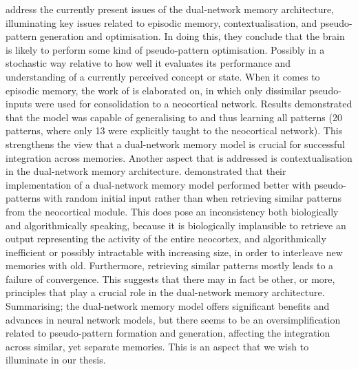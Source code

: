 \cite{French2001} address the currently present issues of the dual-network memory architecture, illuminating key issues related to episodic memory, contextualisation, and pseudo-pattern generation and optimisation. In doing this, they conclude that the brain is likely to perform some kind of pseudo-pattern optimisation. Possibly in a stochastic way relative to how well it evaluates its performance and understanding of a currently perceived concept or state. When it comes to episodic memory, the work of \cite{Ans2000} is elaborated on, in which only dissimilar pseudo-inputs were used for consolidation to a neocortical network. Results demonstrated that the model was capable of generalising to and thus learning all patterns (20 patterns, where only 13 were explicitly taught to the neocortical network). This strengthens the view that a dual-network memory model is crucial for successful integration across memories. Another aspect that is addressed is contextualisation in the dual-network memory architecture. \cite{Ans2000} demonstrated that their implementation of a dual-network memory model performed better with pseudo-patterns with random initial input rather than when retrieving similar patterns from the neocortical module. This does pose an inconsistency both biologically and algorithmically speaking, because it is biologically implausible to retrieve an output representing the activity of the entire neocortex, and algorithmically inefficient or possibly intractable with increasing size, in order to interleave new memories with old. Furthermore, retrieving similar patterns mostly leads to a failure of convergence. This suggests that there may in fact be other, or more, principles that play a crucial role in the dual-network memory architecture. Summarising; the dual-network memory model offers significant benefits and advances in neural network models, but there seems to be an oversimplification related to pseudo-pattern formation and generation, affecting the integration across similar, yet separate memories. This is an aspect that we wish to illuminate in our thesis.

